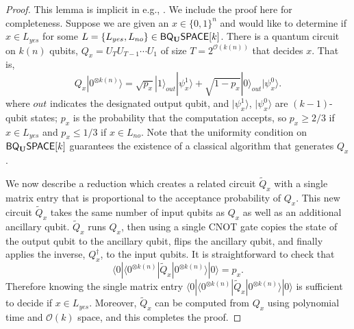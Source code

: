 \documentclass[11pt]{article}
\theoremstyle{definition}
\theoremstyle{remark}
\newcommand{\zero}{\ensuremath{0^{\otimes{k(n)}}}}
\newcommand{\classfont}{\sf}
\newcommand{\Unitary}{\mathbf{U}}
\newcommand{\unitaryBQSPACE}[1]{{\classfont{BQ}_\Unitary\classfont{SPACE}}[#1]}
\begin{document}
\begin{proof}This lemma is implicit in e.g., \cite{bbbv,dawsonnielsen}.  We include the proof here for completeness.  Suppose we are given an $x\in \{0,1\}^n$ and would like to determine if $x\in L_{yes}$ for some $L=\{L_{yes},L_{no}\}\in\unitaryBQSPACE{k}$.  There is a quantum circuit on $k(n)$ qubits, $Q_x=U_TU_{T-1}\cdots U_1$ of size $T=2^{\mathcal{O}(k(n))}$ that decides $x$.  That is, 
\begin{equation}
Q_x|\zero\rangle = \sqrt{p_x} |1\rangle_{out}|\psi_x^1\rangle + \sqrt{1-p_x} |0\rangle_{out} |\psi_x^0\rangle.
\end{equation}
where $out$ indicates the designated output qubit, and $|\psi_x^1\rangle$, $|\psi_x^0\rangle$ are $(k-1)$-qubit states; $p_x$ is the probability that the computation accepts, so $p_x \ge 2/3$ if $x \in L_{yes}$ and $p_x \le 1/3$ if $x \in L_{no}$. Note that the uniformity condition on $\unitaryBQSPACE{k}$ guarantees the existence of a classical algorithm that generates $Q_x$.

We now describe a reduction which creates a related circuit $\tilde{Q}_x$ with a single matrix entry that is proportional to the acceptance probability of $Q_x$.  This new circuit $\tilde{Q}_x$ takes the same number of input qubits as $Q_x$ as well as an additional ancillary qubit.  $\tilde{Q}_x$ runs $Q_x$, then using a single CNOT gate copies the state of the output qubit to the ancillary qubit, flips the ancillary qubit, and finally applies the inverse, $Q_x^{\dagger}$, to the input qubits. It is straightforward to check that
\begin{equation}
\langle 0|\langle \zero|\tilde{Q}_x|\zero\rangle|0\rangle = p_x.
\end{equation}
Therefore knowing the single matrix entry $\langle 0|\langle \zero|\tilde{Q}_x|\zero\rangle|0\rangle$ is sufficient to decide if $x \in L_{yes}$. Moreover, $\tilde{Q}_x$ can be computed from $Q_x$ using polynomial time and $\mathcal{O}(k)$ space, and this completes the proof.
\end{proof}
\end{document}
